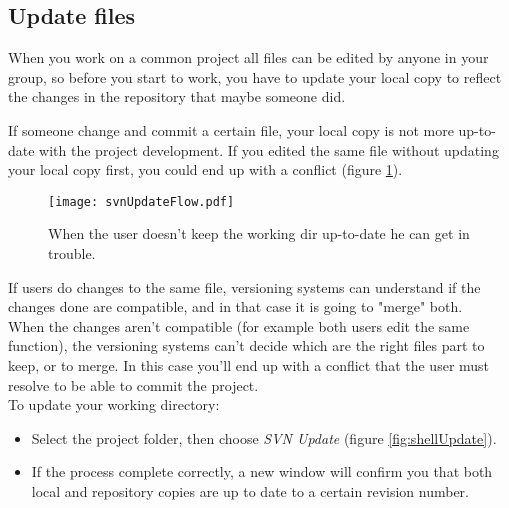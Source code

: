 \newpage









\subsection{Update files}
\label{subsection:UpdateFiles}

When you work on a common project all files can be edited by anyone in your group, so before you start to work, you have to update your local copy to reflect the changes in the repository that maybe someone did.

If someone change and commit a certain file, your local copy is not more up-to-date with the project development. If you edited the same file without updating your local copy first, you could end up with a conflict (figure \ref{fig:svnUpdateFlow}).\\


\begin{figure}[htbp]
    \centering
    \texttt{[image: svnUpdateFlow.pdf]}
    \caption{When the user doesn't keep the working dir up-to-date he can get in trouble.}
    \label{fig:svnUpdateFlow}
\end{figure}


If users do changes to the same file, versioning systems can understand if the changes done are compatible, and in that case it is going to "merge" both.\\




When the changes aren't compatible (for example both users edit the same function), the versioning systems can't decide which are the right files part to keep, or to merge. In this case you'll end up with a conflict that the user must resolve to be able to commit the project.\\




To update your working directory:

\begin{itemize}

    \item Select the project folder, then choose \textit{SVN Update} (figure \ref{fig:shellUpdate}).
    
    \item If the process complete correctly, a new window will confirm you that both local and repository copies are up to date to a certain revision number.

\end{itemize}




